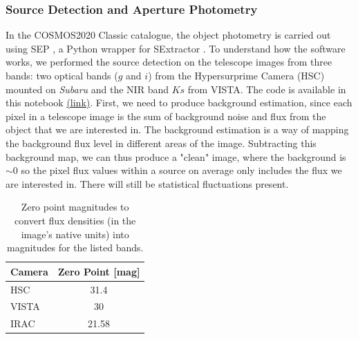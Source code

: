 \subsubsection{Source Detection and Aperture Photometry}
In the COSMOS2020 Classic catalogue, the object photometry is carried out using SEP \cite{SEP_2018}, a Python wrapper for SExtractor \cite{SExtractor_1996}. To understand how the software works, we performed the source detection on the telescope images from three bands: two optical bands ($g$ and $i$) from the Hypersurprime Camera (HSC) mounted on \textit{Subaru} and the NIR band $Ks$ from VISTA. The code is available in this notebook \href{https://github.com/KimiKreil/Bachelor_Thesis_Code/blob/main/Code/Source_Detection.ipynb}{(link)}.
First, we need to produce background estimation, since each pixel in a telescope image is the sum of background noise and flux from the object that we are interested in. The background estimation is a way of mapping the background flux level in different areas of the image. Subtracting this background map, we can thus produce a "clean" image, where the background is $\sim 0$ so the pixel flux values within a source on average only includes the flux we are interested in. There will still be statistical fluctuations present. \\
\begin{table}
    \begin{tabular}{lc}
    \hline
    \textbf{Camera} & \textbf{Zero Point [mag]} \\ \hline
    HSC &  31.4 \\ 
    VISTA &  30 \\ 
    IRAC &  21.58 \\ \hline
    \end{tabular}
    \caption{Zero point magnitudes to convert flux  densities (in the image's native units) into magnitudes for the listed bands.}
    \label{zero_point}
\end{table}

